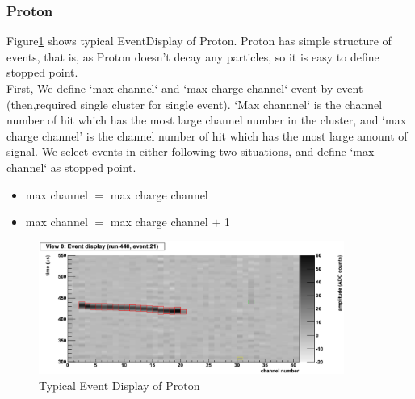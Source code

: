 \subsubsection{Proton}

Figure\ref{fig:Proton_Event_Display} shows typical EventDisplay of Proton.
Proton has simple structure of events, that is,
as Proton doesn't decay any particles, so it is easy to define stopped point.\\
First, We define `max channel` and `max charge channel` event by event
(then,required single cluster for single event).
`Max channnel` is the channel number of hit which has the most large channel number in the cluster,
and `max charge channel' is the channel number of hit which has the most large amount of signal.
We select events in either following two situations, and define `max channel` as stopped point.

\begin{itemize}
\item max channel $=$ max charge channel \\
\item max channel $=$ max charge channel $+$ 1\\
\end{itemize}

\begin{figure}[htbp]
  \centering
  \includegraphics[width=10cm,clip]{./fig/Display_run440_ev21.eps}
  \caption{Typical Event Display of Proton}
  \label{fig:Proton_Event_Display}
\end{figure}
